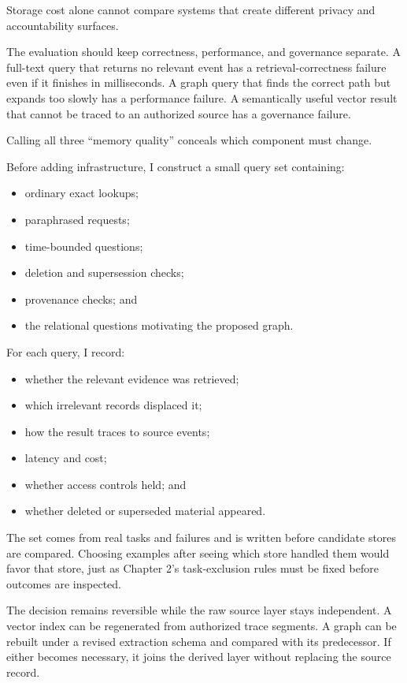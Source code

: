 Storage cost alone cannot compare systems that create different privacy and accountability surfaces.

The evaluation should keep correctness, performance, and governance separate. A full-text query that returns no relevant event has a retrieval-correctness failure even if it finishes in milliseconds. A graph query that finds the correct path but expands too slowly has a performance failure. A semantically useful vector result that cannot be traced to an authorized source has a governance failure.

Calling all three ``memory quality'' conceals which component must change.

Before adding infrastructure, I construct a small query set containing:

\begin{itemize}
\tightlist
\item
  ordinary exact lookups;
\item
  paraphrased requests;
\item
  time-bounded questions;
\item
  deletion and supersession checks;
\item
  provenance checks; and
\item
  the relational questions motivating the proposed graph.
\end{itemize}

For each query, I record:

\begin{itemize}
\tightlist
\item
  whether the relevant evidence was retrieved;
\item
  which irrelevant records displaced it;
\item
  how the result traces to source events;
\item
  latency and cost;
\item
  whether access controls held; and
\item
  whether deleted or superseded material appeared.
\end{itemize}

The set comes from real tasks and failures and is written before candidate stores are compared. Choosing examples after seeing which store handled them would favor that store, just as Chapter 2's task-exclusion rules must be fixed before outcomes are inspected.

The decision remains reversible while the raw source layer stays independent. A vector index can be regenerated from authorized trace segments. A graph can be rebuilt under a revised extraction schema and compared with its predecessor. If either becomes necessary, it joins the derived layer without replacing the source record.

